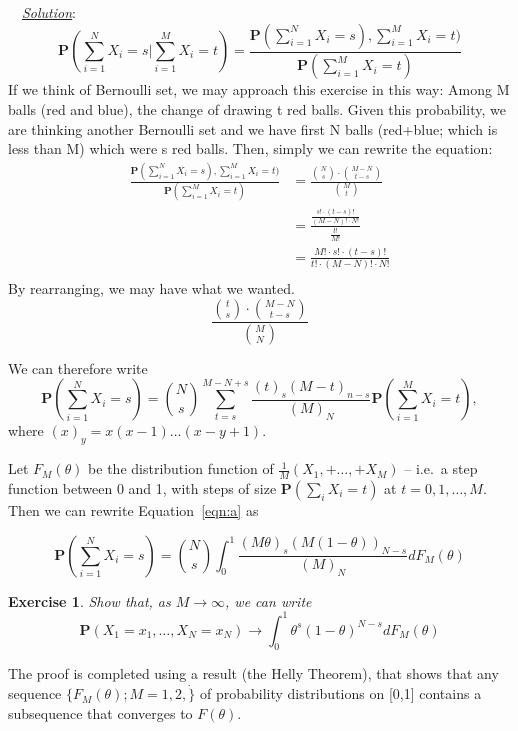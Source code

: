 \documentclass[twoside]{article}
\newcounter{lecnum}
\newtheorem{exercise}{Exercise}[lecnum]
\newenvironment{solution}{
  \begin{flushleft} \noindent ~~\underline{\emph{Solution}}: \rmfamily}{\end{flushleft}}
\newcommand\Prob{\mathbf{P}}
\begin{document}
\begin{solution}
$$\Prob\left(\sum_{i=1}^N X_i = s\Big|\sum_{i=1}^M X_i = t\right) = \frac{\Prob(\sum_{i=1}^N X_i = s), \sum_{i=1}^M X_i = t)}{\Prob(\sum_{i=1}^M X_i = t)}  $$
If we think of Bernoulli set, we may approach this exercise in this way: Among M balls (red and blue), the change of drawing t red balls. Given this probability, we are thinking another Bernoulli set and we have first N balls (red+blue; which is less than M) which were s red balls. Then, simply we can rewrite the equation: 
\begin{equation*}
\begin{split}
\frac{\Prob(\sum_{i=1}^N X_i = s), \sum_{i=1}^M X_i = t)}{\Prob(\sum_{i=1}^M X_i = t)} &=  \frac {{N\choose s} \cdot {M-N\choose t-s}}{{M\choose t}} \\ 
&= \frac{\frac{s! \cdot (t-s)!}{(M-N)! \cdot N!}}{\frac{t!}{M!}} \\ &= \frac{M! \cdot s! \cdot (t-s)!}{t! \cdot (M-N)! \cdot N!} \\
\end{split}
\end{equation*}
By rearranging, we may have what we wanted.
$$ \frac {{t\choose s} \cdot {M-N\choose t-s}}{{M\choose N}} $$ 
\end{solution}

We can therefore write
\begin{equation}\Prob\left(\sum_{i=1}^N X_i = s\right) = {N\choose s}\sum_{t=s}^{M-N+s}\frac{(t)_s(M-t)_{n-s}}{(M)_N}\Prob\left(\sum_{i=1}^M X_i = t\right),\label{eqn:a}\end{equation}
where $(x)_y = x(x-1)\dots (x-y+1)$.

Let $F_M(\theta)$ be the distribution function of $\frac{1}{M}(X_1, + \dots, + X_M)$  --  i.e.\ a step function between 0 and 1, with steps of size $\Prob(\sum_i X_i= t)$ at $t=0,1,\dots, M$. Then we can rewrite Equation~\ref{eqn:a} as

$$\Prob\left(\sum_{i=1}^N X_i = s\right) = {N\choose s}\int_0^1\frac{(M\theta)_s(M(1-\theta))_{N-s}}{(M)_N}dF_M(\theta)$$
\begin{exercise}
  Show that, as $M\rightarrow \infty$, we can write
  $$\Prob\left(X_1 =x_1,\dots, X_N=x_N \right) \rightarrow \int_0^1\theta^s(1-\theta)^{N-s}dF_M(\theta)$$
\end{exercise}
The proof is completed using a result (the Helly Theorem), that shows that any sequence $\{F_M(\theta); M=1,2,\dot\}$ of probability distributions on [0,1] contains a subsequence that converges to $F(\theta)$.
\end{document}
